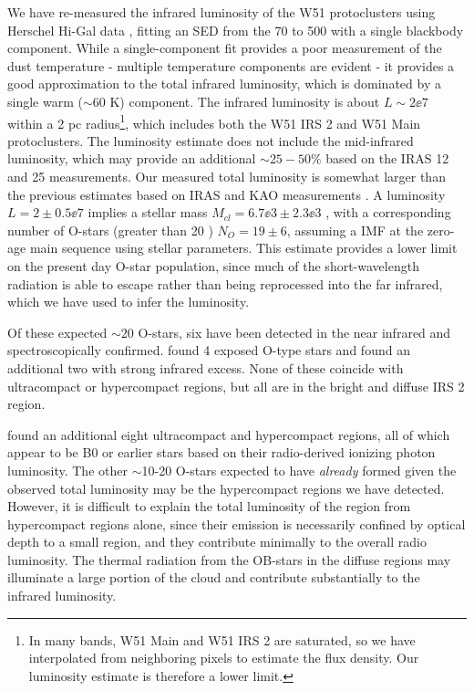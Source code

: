 We have re-measured the infrared luminosity of the W51 protoclusters using Herschel
Hi-Gal data \citep{Molinari2010a,Traficante2011a}, fitting an SED from the 70
to 500 \um with a single blackbody component.
While a single-component fit provides a poor
measurement of the dust temperature - multiple temperature components are
evident \citep{Sievers1991a} - it provides a good approximation to the total
infrared luminosity, which is dominated by a single warm ($\sim60$ K)
component.  The infrared luminosity is about $L\sim2\ee{7}$ \lsun within a 2 pc
radius\footnote{In many bands, W51 Main and W51 IRS 2 are
saturated, so we have interpolated from neighboring pixels to estimate the flux
density.
Our luminosity estimate is therefore a lower limit.}, which includes
both the W51 IRS 2 and W51 Main protoclusters.  The luminosity estimate does not
include the mid-infrared luminosity, which may provide an additional
$\sim25-50\%$ based on
the IRAS 12 and 25 \um measurements.  Our measured total luminosity is somewhat
larger than the previous estimates based on IRAS and KAO measurements
\citep{Harvey1986a,Sievers1991a}.
A luminosity $L=2\pm0.5\ee{7}$ \lsun implies
a stellar mass $M_{cl} = 6.7\ee{3} \pm 2.3\ee{3}$ \msun, with a corresponding number of
O-stars (greater than 20 \msun) $N_O = 19 \pm 6$, assuming a
\citet{Kroupa2001a} IMF at the zero-age main sequence using \citet{Vacca1996a}
stellar parameters.  This estimate provides a lower limit on the present day
O-star population, since much of the short-wavelength radiation is able to
escape rather than being reprocessed into the far infrared, which we have used
to infer the luminosity.

Of these expected $\sim20$ O-stars, six have been detected in the near infrared
and spectroscopically confirmed.  \citet{Figueredo2008a} found 4 exposed O-type
stars and \citet{Barbosa2008a} found an additional two with strong infrared
excess.  None of these coincide with ultracompact or hypercompact \hii regions,
but all are in the bright and diffuse IRS 2 \hii region.

\citet{Mehringer1994a} found an additional eight ultracompact and hypercompact
\hii regions, all of which appear to be B0 or earlier stars based on their
radio-derived ionizing photon luminosity.  The other $\sim$10-20 O-stars
expected to have \emph{already} formed given the observed total luminosity may
be the hypercompact \hii regions we have detected.  However, it is difficult to
explain the total luminosity of the region from hypercompact \hii regions
alone, since their emission is necessarily confined by optical depth to a small
region, and they contribute minimally to the overall radio luminosity.  The
thermal radiation from the OB-stars in the diffuse \hii regions may illuminate
a large portion of the cloud and contribute substantially to the infrared
luminosity.

